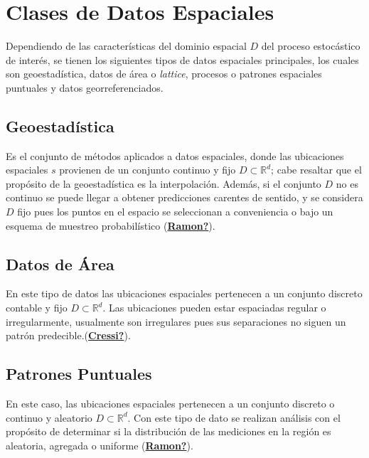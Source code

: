 \documentclass[
]{book}
\begin{document}
\hypertarget{clases-de-datos-espaciales}{%
\section{Clases de Datos Espaciales}\label{clases-de-datos-espaciales}}

Dependiendo de las características del dominio espacial \(D\) del proceso estocástico de interés, se tienen los siguientes tipos de datos espaciales principales, los cuales son geoestadística, datos de área o \textit{lattice}, procesos o patrones espaciales puntuales y datos georreferenciados.

\hypertarget{geoestaduxedstica}{%
\subsection{Geoestadística}\label{geoestaduxedstica}}

Es el conjunto de métodos aplicados a datos espaciales, donde las ubicaciones espaciales \(s\) provienen de un conjunto continuo y fijo \(D \subset \mathbb{R}^d\); cabe resaltar que el propósito de la geoestadística es la interpolación. Además, si el conjunto \(D\) no es continuo se puede llegar a obtener predicciones carentes de sentido, y se considera \(D\) fijo pues los puntos en el espacio se seleccionan a conveniencia o bajo un esquema de muestreo probabilístico (\protect\hyperlink{ref-Ramon}{\textbf{Ramon?}}).

\hypertarget{datos-de-uxe1rea}{%
\subsection{Datos de Área}\label{datos-de-uxe1rea}}

En este tipo de datos las ubicaciones espaciales pertenecen a un conjunto discreto contable y fijo \(D \subset \mathbb{R}^d\). Las ubicaciones pueden estar espaciadas regular o irregularmente, usualmente son irregulares pues sus separaciones no siguen un patrón predecible.(\protect\hyperlink{ref-Cressi}{\textbf{Cressi?}}).

\hypertarget{patrones-puntuales}{%
\subsection{Patrones Puntuales}\label{patrones-puntuales}}

En este caso, las ubicaciones espaciales pertenecen a un conjunto discreto o continuo y aleatorio \(D\subset \mathbb{R}^d\). Con este tipo de dato se realizan análisis con el propósito de determinar si la distribución de las mediciones en la región es aleatoria, agregada o uniforme (\protect\hyperlink{ref-Ramon}{\textbf{Ramon?}}).
\end{document}
